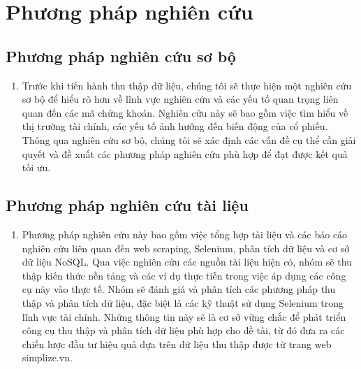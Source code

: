 \section{Phương pháp nghiên cứu}
\subsection{Phương pháp nghiên cứu sơ bộ}
\begin{enumerate}
    \item []
    \hspace*{0.7cm}Trước khi tiến hành thu thập dữ liệu, chúng tôi sẽ thực hiện một nghiên cứu sơ bộ để hiểu rõ hơn về lĩnh vực nghiên cứu và các yếu tố quan trọng liên quan đến các mã chứng khoán. Nghiên cứu này sẽ bao gồm việc tìm hiểu về thị trường tài chính, các yếu tố ảnh hưởng đến biến động của cổ phiếu. Thông qua nghiên cứu sơ bộ, chúng tôi sẽ xác định các vấn đề cụ thể cần giải quyết và đề xuất các phương pháp nghiên cứu phù hợp để đạt được kết quả tối ưu.
\end{enumerate}

\subsection{Phương pháp nghiên cứu tài liệu}
\begin{enumerate}
    \item []
    \hspace*{0.7cm}Phương pháp nghiên cứu này bao gồm việc tổng hợp tài liệu và các báo cáo nghiên cứu liên quan đến web scraping, Selenium, phân tích dữ liệu và cơ sở dữ liệu NoSQL. Qua việc nghiên cứu các nguồn tài liệu hiện có, nhóm sẽ thu thập kiến thức nền tảng và các ví dụ thực tiễn trong việc áp dụng các công cụ này vào thực tế. Nhóm sẽ đánh giá và phân tích các phương pháp thu thập và phân tích dữ liệu, đặc biệt là các kỹ thuật sử dụng Selenium trong lĩnh vực tài chính. Những thông tin này sẽ là cơ sở vững chắc để phát triển công cụ thu thập và phân tích dữ liệu phù hợp cho đề tài, từ đó đưa ra các chiến lược đầu tư hiệu quả dựa trên dữ liệu thu thập được từ trang web simplize.vn.
\end{enumerate}

